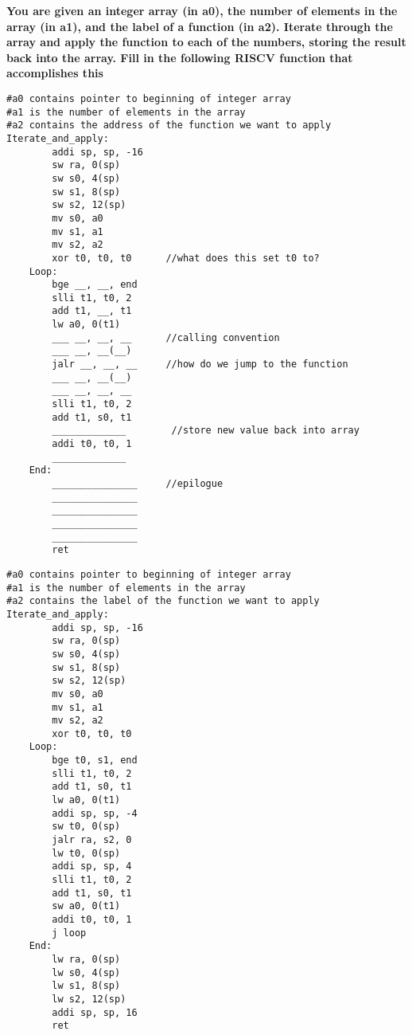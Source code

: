 \question
\footnotesize
\textbf{
You are given an integer array (in a0), the number of elements in the array (in a1), and the label of a function (in a2). Iterate through the array and apply the function to each of the numbers, storing the result back into the array. Fill in the following RISCV function that accomplishes this}
\begin{verbatim}
#a0 contains pointer to beginning of integer array
#a1 is the number of elements in the array
#a2 contains the address of the function we want to apply
Iterate_and_apply:
        addi sp, sp, -16
        sw ra, 0(sp)
        sw s0, 4(sp)
        sw s1, 8(sp)
        sw s2, 12(sp)
        mv s0, a0
        mv s1, a1
        mv s2, a2
        xor t0, t0, t0      //what does this set t0 to?
    Loop:
        bge __, __, end
        slli t1, t0, 2
        add t1, __, t1
        lw a0, 0(t1)
        ___ __, __, __      //calling convention
        ___ __, __(__)
        jalr __, __, __     //how do we jump to the function
        ___ __, __(__)
        ___ __, __, __
        slli t1, t0, 2
        add t1, s0, t1
        _____________        //store new value back into array
        addi t0, t0, 1
        _____________
    End:
        _______________     //epilogue
        _______________
        _______________
        _______________
        _______________
        ret
\end{verbatim}

\begin{solution}
\begin{verbatim}
#a0 contains pointer to beginning of integer array
#a1 is the number of elements in the array
#a2 contains the label of the function we want to apply
Iterate_and_apply:
        addi sp, sp, -16
        sw ra, 0(sp)
        sw s0, 4(sp)
        sw s1, 8(sp)
        sw s2, 12(sp)
        mv s0, a0
        mv s1, a1
        mv s2, a2
        xor t0, t0, t0
    Loop:
        bge t0, s1, end
        slli t1, t0, 2
        add t1, s0, t1
        lw a0, 0(t1)
        addi sp, sp, -4
        sw t0, 0(sp)
        jalr ra, s2, 0
        lw t0, 0(sp)
        addi sp, sp, 4
        slli t1, t0, 2
        add t1, s0, t1
        sw a0, 0(t1)
        addi t0, t0, 1
        j loop
    End:
        lw ra, 0(sp)
        lw s0, 4(sp)
        lw s1, 8(sp)
        lw s2, 12(sp)
        addi sp, sp, 16
        ret
\end{verbatim}

\end{solution}